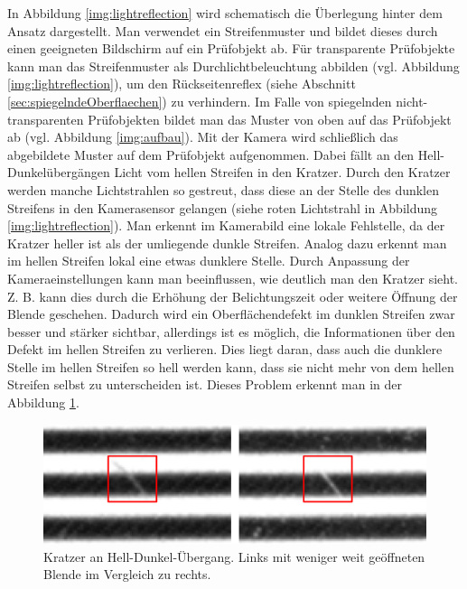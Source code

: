 \noindent
In Abbildung \ref{img:lightreflection} wird schematisch die Überlegung hinter dem Ansatz dargestellt.
Man verwendet ein Streifenmuster und bildet dieses durch einen geeigneten Bildschirm auf ein Prüfobjekt ab.
Für transparente Prüfobjekte kann man das Streifenmuster als Durchlichtbeleuchtung abbilden (vgl. Abbildung \ref{img:lightreflection}), um den Rückseitenreflex (siehe Abschnitt \ref{sec:spiegelndeOberflaechen}) zu verhindern.
Im Falle von spiegelnden nicht-transparenten Prüfobjekten bildet man das Muster von oben auf das Prüfobjekt ab (vgl. Abbildung \ref{img:aufbau}).
Mit der Kamera wird schließlich das abgebildete Muster auf dem Prüfobjekt aufgenommen.
Dabei fällt an den Hell-Dunkelübergängen Licht vom hellen Streifen in den Kratzer.
Durch den Kratzer werden manche Lichtstrahlen so gestreut, dass diese an der Stelle des dunklen Streifens in den Kamerasensor gelangen (siehe roten Lichtstrahl in Abbildung \ref{img:lightreflection}).
Man erkennt im Kamerabild eine lokale Fehlstelle, da der Kratzer heller ist als der umliegende dunkle Streifen.
Analog dazu erkennt man im hellen Streifen lokal eine etwas dunklere Stelle.
Durch Anpassung der Kameraeinstellungen kann man beeinflussen, wie deutlich man den Kratzer sieht.
Z. B. kann dies durch die Erhöhung der Belichtungszeit oder weitere Öffnung der Blende geschehen.
Dadurch wird ein Oberflächendefekt im dunklen Streifen zwar besser und stärker sichtbar, allerdings ist es möglich, die Informationen über den Defekt im hellen Streifen zu verlieren.
Dies liegt daran, dass auch die dunklere Stelle im hellen Streifen so hell werden kann, dass sie nicht mehr von dem hellen Streifen selbst zu unterscheiden ist.
Dieses Problem erkennt man in der Abbildung \ref{img:scratches}.

\begin{figure}[H]
	\centering
	\includegraphics[width=\textwidth]{03_sichtpruefungDurchLichtstreuung/verfahren/figures/visibleScratch}
	\caption[Kratzer]{Kratzer an Hell-Dunkel-Übergang. Links mit weniger weit geöffneten Blende im Vergleich zu rechts.}
	\label{img:scratches}
\end{figure}

